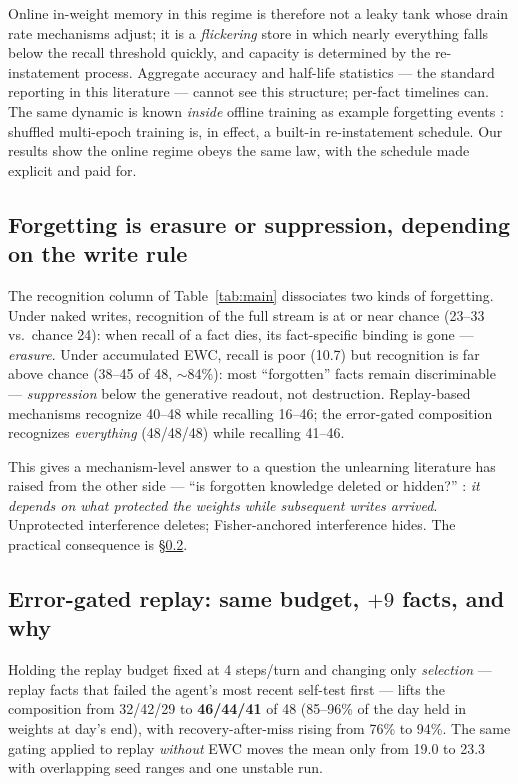\documentclass[11pt]{article}
\begin{document}
Online in-weight memory in this regime is therefore not a leaky tank whose drain rate mechanisms
adjust; it is a \emph{flickering} store in which nearly everything falls below the recall threshold
quickly, and capacity is determined by the re-instatement process. Aggregate accuracy and half-life
statistics --- the standard reporting in this literature --- cannot see this structure; per-fact timelines
can. The same dynamic is known \emph{inside} offline training as example forgetting events
\citep{toneva2019}: shuffled multi-epoch training is, in effect, a built-in re-instatement schedule.
Our results show the online regime obeys the same law, with the schedule made explicit and paid for.

\subsection{Forgetting is erasure or suppression, depending on the write rule}\label{sec:suppression}

The recognition column of Table~\ref{tab:main} dissociates two kinds of forgetting. Under naked writes,
recognition of the full stream is at or near chance (23--33 vs.\ chance 24): when recall of a fact
dies, its fact-specific binding is gone --- \emph{erasure}. Under accumulated EWC, recall is poor (10.7)
but recognition is far above chance (38--45 of 48, $\sim$84\%): most ``forgotten'' facts remain
discriminable --- \emph{suppression} below the generative readout, not destruction. Replay-based
mechanisms recognize 40--48 while recalling 16--46; the error-gated composition recognizes
\emph{everything} (48/48/48) while recalling 41--46.

This gives a mechanism-level answer to a question the unlearning literature has raised from the other
side --- ``is forgotten knowledge deleted or hidden?''
\citep{unlearning-deletion,quantization-unlearning}: \emph{it depends on what protected the weights
while subsequent writes arrived}. Unprotected interference deletes; Fisher-anchored interference hides.
The practical consequence is \S\ref{sec:errorgated}.

\subsection{Error-gated replay: same budget, $+9$ facts, and why}\label{sec:errorgated}

Holding the replay budget fixed at 4 steps/turn and changing only \emph{selection} --- replay facts that
failed the agent's most recent self-test first --- lifts the composition from 32/42/29 to
\textbf{46/44/41} of 48 (85--96\% of the day held in weights at day's end), with recovery-after-miss
rising from 76\% to 94\%. The same gating applied to replay \emph{without} EWC moves the mean only from
19.0 to 23.3 with overlapping seed ranges and one unstable run.
\end{document}
